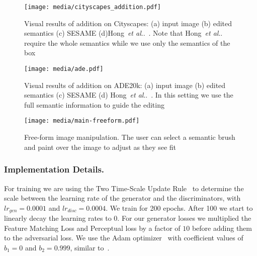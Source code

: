 \documentclass[runningheads]{llncs}
\makeatletter
\DeclareRobustCommand\onedot{\futurelet\@let@token\@onedot}
\def\@onedot{\ifx\@let@token.\else.\null\fi\xspace}
\def\etal{\emph{et al}\onedot}
\def\hong{Hong~\etal~\cite{hong2018learning}}
\makeatother
\begin{document}
\begin{figure}[t]
\begin{center}
    \centering
    \texttt{[image: media/cityscapes\_addition.pdf]}
    \caption{Visual results of addition on Cityscapes: (a) input image (b) edited semantics (c) SESAME (d)\hong{}. Note that \hong{} require the whole semantics while we use only the semantics of the box}
    \label{fig:city_results}
\end{center}
\end{figure}

\begin{figure}[t]
\begin{center}
    \centering
    \texttt{[image: media/ade.pdf]}
    \caption{Visual results of addition on ADE20k: (a) input image (b) edited semantics (c) SESAME (d) \hong{}. In this setting we use the full semantic information to guide the editing}
    \label{fig:ade_results}
\end{center}
\end{figure}

\begin{figure}[t]
\begin{center}
    \centering
    \texttt{[image: media/main-freeform.pdf]}
    \caption{Free-form image manipulation. The user can select a semantic brush and paint over the image to adjust as they see fit}
    \label{fig:freeform}
\end{center}
\end{figure}



\subsubsection{Implementation Details.}
\label{ssc:implementation_details}
For training we are using the Two Time-Scale Update Rule~\cite{NIPS2017_7240} to determine the scale between the learning rate of the generator and the discriminators, with $lr_{gen} = 0.0001 $ and $lr_{disc} = 0.0004$.
We train for 200 epochs.
After 100 we start to linearly decay the learning rates to $0$.
For our generator losses we multiplied the Feature Matching Loss and Perceptual loss by a factor of $10$ before adding them to the adversarial loss. We use the Adam optimizer~\cite{adam} with coefficient values of $b_1 = 0$ and $b_2 = 0.999$, similar to~\cite{park2019SPADE}.
\end{document}
